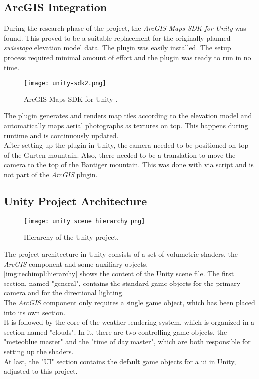 \subsection{ArcGIS Integration}
\label{section:techimpl:arcgis}
During the research phase of the project, the \emph{ArcGIS Maps SDK for Unity} \cite{arcgis:unitysdk} was found. This proved to be a suitable replacement for the originally planned \emph{swisstopo} elevation model data.
The plugin was easily installed. The setup process required minimal amount of effort and the plugin was ready to run in no time. 

\begin{figure}[H]
    \texttt{[image: unity-sdk2.png]}
    \caption{ArcGIS Maps SDK for Unity \protect\cite{arcgis:unitysdk}.}
\end{figure}

\noindent
The plugin generates and renders map tiles according to the elevation model and automatically maps aerial photographs as textures on top.
This happens during runtime and is continuously updated.
\\
After setting up the plugin in Unity, the camera needed to be positioned on top of the Gurten mountain. Also, there needed to be a translation to move the camera to the top of the Bantiger mountain.
This was done with via script and is not part of the \emph{ArcGIS} plugin.

\subsection{Unity Project Architecture}
\begin{wrapfigure}[13]{r}{4cm}
    \vspace{-\baselineskip}
    \texttt{[image: unity scene hierarchy.png]}
    \caption{Hierarchy of the Unity project.}
    \label{img:techimpl:hierarchy}
\end{wrapfigure}
The project architecture in Unity consists of a set of \gls{volumetric} \gls{shader}s, the \emph{ArcGIS} component and some auxiliary objects.
\\
\autoref{img:techimpl:hierarchy} shows the content of the Unity scene file.
The first section, named "general", contains the standard game objects for the primary camera and for the directional lighting.
\\
The \emph{ArcGIS} component only requires a single game object, which has been placed into its own section.
\\
It is followed by the core of the weather rendering system, which is organized in a section named "clouds".
In it, there are two controlling game objects, the "meteoblue master" and the "time of day master", which are both responsible for setting up the shaders.
\\
At last, the "UI" section contains the default game objects for a \gls{ui} in Unity, adjusted to this project.

